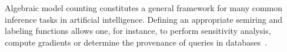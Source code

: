 Algebraic model counting constitutes a general framework for many common inference tasks in artificial intelligence. Defining an appropriate semiring and labeling functions allows one, for instance, to perform sensitivity analysis, compute gradients or determine the provenance of queries in databases~\citep{kimmig2017algebraic}.

















